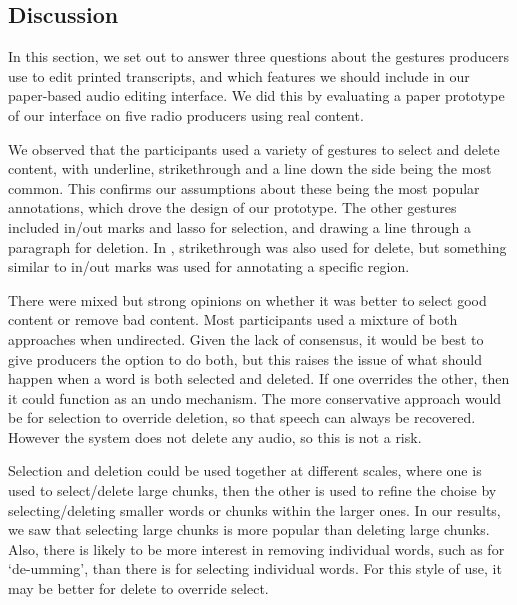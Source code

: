 \subsection{Discussion}

In this section, we set out to answer three questions about the gestures producers use to edit printed transcripts, and
which features we should include in our paper-based audio editing interface. We did this by evaluating a paper
prototype of our interface on five radio producers using real content.


We observed that the participants used a variety of gestures to select and delete content, with underline,
strikethrough and a line down the side being the most common.  This confirms our assumptions about these being the most
popular annotations, which drove the design of our prototype.  The other gestures included in/out marks and lasso for
selection, and drawing a line through a paragraph for deletion.  In \citet{Weibel2008}, strikethrough was also used for
delete, but something similar to in/out marks was used for annotating a specific region.

There were mixed but strong opinions on whether it was better to select good content or remove bad content.  Most
participants used a mixture of both approaches when undirected. Given the lack of consensus, it would be best to give
producers the option to do both, but this raises the issue of what should happen when a word is both selected and
deleted.  If one overrides the other, then it could function as an undo mechanism. The more conservative approach would
be for selection to override deletion, so that speech can always be recovered. However the system does not delete any
audio, so this is not a risk.

Selection and deletion could be used together at different scales, where one is used to select/delete large chunks,
then the other is used to refine the choise by selecting/deleting smaller words or chunks within the larger ones. In
our results, we saw that selecting large chunks is more popular than deleting large chunks. Also, there is likely to be
more interest in removing individual words, such as for `de-umming', than there is for selecting individual words. For
this style of use, it may be better for delete to override select.

